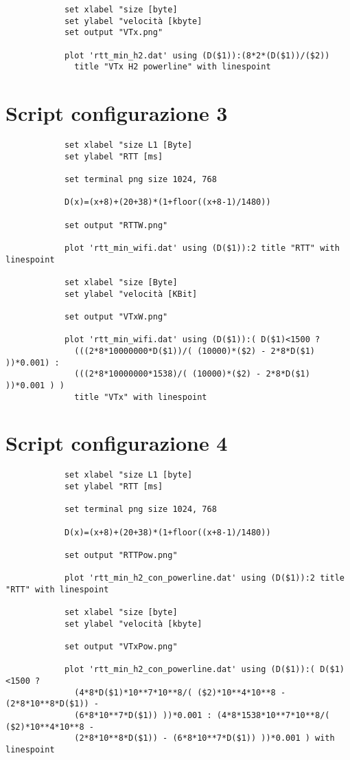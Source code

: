 \documentclass[../lab2.tex]{subfiles}
\begin{document}
\begin{appendices}
\begin{verbatim}
            set xlabel "size [byte]
            set ylabel "velocità [kbyte]
            set output "VTx.png"

            plot 'rtt_min_h2.dat' using (D($1)):(8*2*(D($1))/($2)) 
              title "VTx H2 powerline" with linespoint
        \end{verbatim}

        \section{Script configurazione 3}
        \begin{verbatim}
            set xlabel "size L1 [Byte]
            set ylabel "RTT [ms]

            set terminal png size 1024, 768

            D(x)=(x+8)+(20+38)*(1+floor((x+8-1)/1480))

            set output "RTTW.png"

            plot 'rtt_min_wifi.dat' using (D($1)):2 title "RTT" with linespoint

            set xlabel "size [Byte]
            set ylabel "velocità [KBit]

            set output "VTxW.png"

            plot 'rtt_min_wifi.dat' using (D($1)):( D($1)<1500 ? 
              (((2*8*10000000*D($1))/( (10000)*($2) - 2*8*D($1) ))*0.001) :
              (((2*8*10000000*1538)/( (10000)*($2) - 2*8*D($1) ))*0.001 ) ) 
              title "VTx" with linespoint
        \end{verbatim}

        \section{Script configurazione 4}
        \begin{verbatim}
            set xlabel "size L1 [byte]
            set ylabel "RTT [ms]

            set terminal png size 1024, 768

            D(x)=(x+8)+(20+38)*(1+floor((x+8-1)/1480))

            set output "RTTPow.png"

            plot 'rtt_min_h2_con_powerline.dat' using (D($1)):2 title "RTT" with linespoint

            set xlabel "size [byte]
            set ylabel "velocità [kbyte]

            set output "VTxPow.png"

            plot 'rtt_min_h2_con_powerline.dat' using (D($1)):( D($1)<1500 ? 
              (4*8*D($1)*10**7*10**8/( ($2)*10**4*10**8 - (2*8*10**8*D($1)) - 
              (6*8*10**7*D($1)) ))*0.001 : (4*8*1538*10**7*10**8/( ($2)*10**4*10**8 - 
              (2*8*10**8*D($1)) - (6*8*10**7*D($1)) ))*0.001 ) with linespoint
        \end{verbatim}

  \end{appendices}
\end{document}

